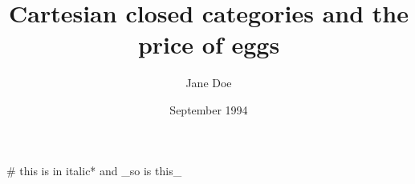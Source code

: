 \documentclass{article}
\title{Cartesian closed categories and the price of eggs}
\author{Jane Doe}
\date{September 1994}
\begin{document}
	# this is in italic*  and _so is this_
	
\end{document}
